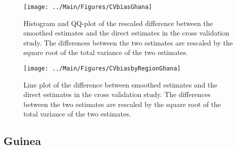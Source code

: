 \documentclass[12pt]{article}\usepackage[]{graphicx}\usepackage[]{color}
\newenvironment{knitrout}{}{} %
\begin{document}
\begin{knitrout}
\color{fgcolor}\begin{figure}[bht]

{\centering \texttt{[image: ../Main/Figures/CVbiasGhana]} 

}

\caption[Histogram and QQ-plot of the rescaled difference between the smoothed estimates and the direct estimates in the cross validation study]{Histogram and QQ-plot of the rescaled difference between the smoothed estimates and the direct estimates in the cross validation study. The differences between the two estimates are rescaled by the square root of the total variance of the two estimates.}\label{fig:unnamed-chunk-149}
\end{figure}


\end{knitrout}

\begin{knitrout}
\color{fgcolor}\begin{figure}[bht]

{\centering \texttt{[image: ../Main/Figures/CVbiasbyRegionGhana]} 

}

\caption[Line plot of the difference between smoothed estimates and the direct estimates in the cross validation study]{Line plot of the difference between smoothed estimates and the direct estimates in the cross validation study. The differences between the two estimates are rescaled by the square root of the total variance of the two estimates.}\label{fig:unnamed-chunk-150}
\end{figure}


\end{knitrout}


\clearpage
\subsection{Guinea}


\end{document}
